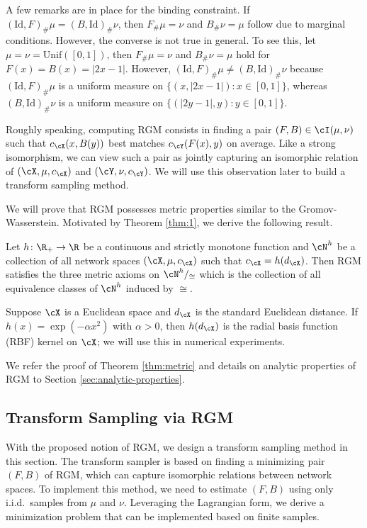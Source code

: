 \documentclass[11pt]{article}
\begin{document}
\begin{remark}
	\rm
	A few remarks are in place for the binding constraint.
	If $(\mathrm{Id}, F)_{\#}\mu = (B, \mathrm{Id})_{\#} \nu$, then $F_{\#} \mu = \nu$ and $B_{\#} \nu = \mu$ follow due to marginal conditions. However, the converse is not true in general. To see this, let $\mu = \nu = \mathrm{Unif}([0, 1])$, then $F_{\#} \mu = \nu$ and $B_{\#} \nu = \mu$ hold for $F(x) = B(x) = |2 x - 1|$. However, $(\mathrm{Id}, F)_{\#}\mu \neq (B, \mathrm{Id})_{\#} \nu$ because $(\mathrm{Id}, F)_{\#}\mu$ is a uniform measure on $\{(x, |2x-1|): x \in [0, 1]\}$, whereas $(B, \mathrm{Id})_{\#} \nu$ is a uniform measure on $\{(|2y-1|, y): y \in [0, 1]\}$.
\end{remark}

Roughly speaking, computing RGM consists in finding a pair $(F, B) \in \cI(\mu, \nu)$ such that $c_{\cX}(x, B(y))$ best matches $c_{\cY}(F(x), y)$ on average. Like a strong isomorphism, we can view such a pair as jointly capturing an isomorphic relation of $(\cX, \mu, c_{\cX})$ and $(\cY, \nu, c_{\cY})$. We will use this observation later to build a transform sampling method.

We will prove that RGM possesses metric properties similar to the Gromov-Wasserstein. Motivated by Theorem \ref{thm:1}, we derive the following result.
\begin{theorem}
	\label{thm:metric}
	Let $h \colon \R_+ \to \R$ be a continuous and strictly monotone function and $\cN^{h}$ be a collection of all network spaces $(\cX, \mu, c_{\cX})$ such that $c_{\cX} = h(d_{\cX})$. Then RGM satisfies the three metric axioms on $\cN^h/_{\cong}$ which is the collection of all equivalence classes of $\cN^h$ induced by $\cong$.
\end{theorem}
\begin{remark}
	\rm
	Suppose $\cX$ is a Euclidean space and $d_{\cX}$ is the standard Euclidean distance. If $h(x) = \exp(- \alpha x^2)$ with $\alpha > 0$, then $h(d_{\cX})$ is the radial basis function (RBF) kernel on $\cX$; we will use this in numerical experiments.
\end{remark}

We refer the proof of Theorem \ref{thm:metric} and details on analytic properties of RGM to Section \ref{sec:analytic-properties}.


\subsection{Transform Sampling via RGM}
With the proposed notion of RGM, we design a transform sampling method in this section. The transform sampler is based on finding a minimizing pair $(F, B)$ of RGM, which can capture isomorphic relations between network spaces. To implement this method, we need to estimate $(F, B)$ using only i.i.d.\ samples from $\mu$ and $\nu$. Leveraging the Lagrangian form, we derive a minimization problem that can be implemented based on finite samples.
\end{document}
